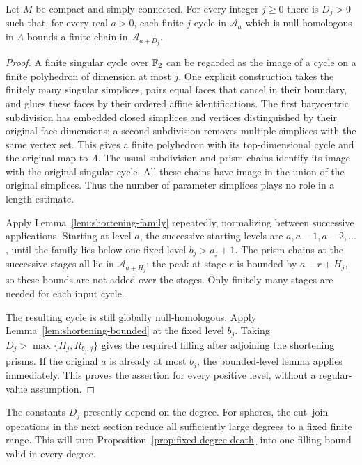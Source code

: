 \begin{proposition}\label{prop:fixed-degree-death}
Let $M$ be compact and simply connected.  For every integer $j\ge0$
there is $D_j>0$ such that, for every real $a>0$, each finite $j$-cycle
in $\mathcal A_a$ which is null-homologous in $\Lambda$ bounds a finite
chain in $\mathcal A_{a+D_j}$.
\end{proposition}

\begin{proof}
A finite singular cycle over $\mathbb F_2$ can be regarded as the image of a
cycle on a finite polyhedron of dimension at most $j$.  One explicit
construction takes the finitely many singular simplices, pairs equal
faces that cancel in their boundary, and glues these faces by their
ordered affine identifications.  The first barycentric subdivision has
embedded closed simplices and vertices distinguished by their original
face dimensions; a second subdivision removes multiple simplices with
the same vertex set.  This gives a finite polyhedron with its
top-dimensional cycle and the original map to $\Lambda$.
The usual subdivision and prism chains identify its image with the
original singular cycle.  All these chains have image in the union of
the original simplices.  Thus the number of parameter simplices plays
no role in a length estimate.

Apply Lemma~\ref{lem:shortening-family} repeatedly, normalizing between
successive applications.  Starting at level $a$, the successive
starting levels are $a,a-1,a-2,\ldots$, until the family lies below one
fixed level $b_j>a_j+1$.  The prism chains at the successive stages
all lie in $\mathcal A_{a+H_j}$: the peak at stage $r$ is bounded by
$a-r+H_j$, so these bounds are not added over the stages.  Only finitely
many stages are needed for each input cycle.

The resulting cycle is still globally null-homologous.  Apply
Lemma~\ref{lem:shortening-bounded} at the fixed level $b_j$.  Taking
$D_j>\max\{H_j,R_{b_j,j}\}$ gives the required filling after adjoining
the shortening prisms.  If the original $a$ is already at most $b_j$,
the bounded-level lemma applies immediately.  This proves the assertion
for every positive level, without a regular-value assumption.
\end{proof}

The constants $D_j$ presently depend on the degree.  For spheres, the
cut--join operations in the next section reduce all sufficiently large
degrees to a fixed finite range.  This will turn
Proposition~\ref{prop:fixed-degree-death} into one filling bound valid
in every degree.

